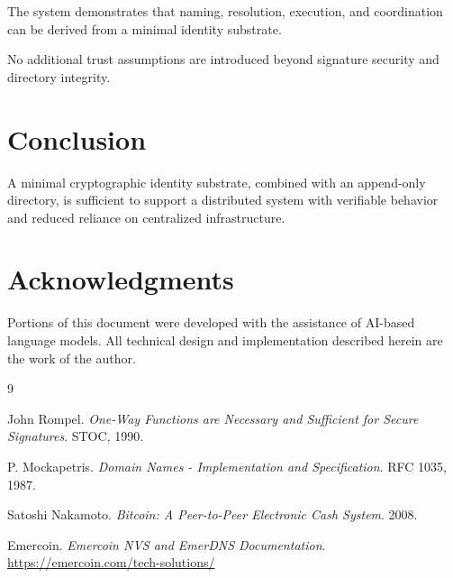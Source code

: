 \documentclass[11pt,a4paper]{article}
\begin{document}
The system demonstrates that naming, resolution, execution, and coordination can be derived from a minimal identity substrate.

No additional trust assumptions are introduced beyond signature security and directory integrity.

\section{Conclusion}

A minimal cryptographic identity substrate, combined with an append-only directory, is sufficient to support a distributed system with verifiable behavior and reduced reliance on centralized infrastructure.

\section*{Acknowledgments}

Portions of this document were developed with the assistance of AI-based language models. All technical design and implementation described herein are the work of the author.

\begin{thebibliography}{9}

John Rompel.
\textit{One-Way Functions are Necessary and Sufficient for Secure Signatures}.
STOC, 1990.

P. Mockapetris.
\textit{Domain Names - Implementation and Specification}.
RFC 1035, 1987.

Satoshi Nakamoto.
\textit{Bitcoin: A Peer-to-Peer Electronic Cash System}.
2008.

Emercoin.
\textit{Emercoin NVS and EmerDNS Documentation}.
\url{https://emercoin.com/tech-solutions/}

\end{thebibliography}
\end{document}
